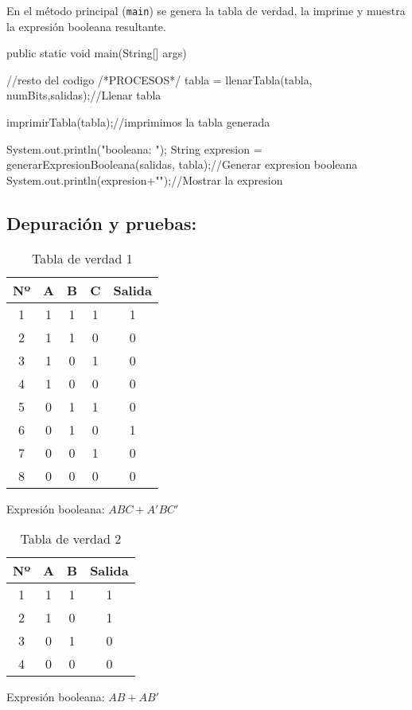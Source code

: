 En el método principal (\texttt{main}) se genera la tabla de verdad, la imprime y muestra la expresión booleana resultante.
\begin{javaCode}
public static void main(String[] args) {
    //resto del codigo
    /*PROCESOS*/
    tabla = llenarTabla(tabla, numBits,salidas);//Llenar tabla
    
    imprimirTabla(tabla);//imprimimos la tabla generada
    
    System.out.println("\nExpresion booleana: ");
    String expresion = generarExpresionBooleana(salidas, tabla);//Generar expresion booleana
    System.out.println(expresion+"\n");//Mostrar la expresion
}
\end{javaCode}

\subsection{\textbf{Depuración y pruebas:}}

\begin{table}[h]
\centering
\begin{tabular}{|c|c|c|c|c|}
\hline
\textbf{Nº} & \textbf{A} & \textbf{B} & \textbf{C} & \textbf{Salida} \\
\hline
1 & 1 & 1 & 1 & 1 \\
2 & 1 & 1 & 0 & 0 \\
3 & 1 & 0 & 1 & 0 \\
4 & 1 & 0 & 0 & 0 \\
5 & 0 & 1 & 1 & 0 \\
6 & 0 & 1 & 0 & 1 \\
7 & 0 & 0 & 1 & 0 \\
8 & 0 & 0 & 0 & 0 \\
\hline
\end{tabular}
\caption{Tabla de verdad 1}
Expresión booleana: $ABC + A'BC'$
\end{table}
\newpage
\begin{table}[h]
\centering
\begin{tabular}{|c|c|c|c|}
\hline
\textbf{Nº} & \textbf{A} & \textbf{B} & \textbf{Salida} \\
\hline
1 & 1 & 1 & 1 \\
2 & 1 & 0 & 1 \\
3 & 0 & 1 & 0 \\
4 & 0 & 0 & 0 \\
\hline
\end{tabular}
\caption{Tabla de verdad 2}
Expresión booleana: $AB + AB'$
\end{table}

